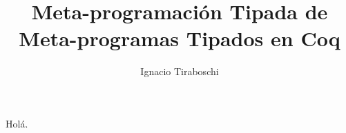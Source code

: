 \documentclass[11pt]{article}
\author{Ignacio Tiraboschi}
\title{Meta-programación Tipada de Meta-programas Tipados en Coq}
\begin{document}
\maketitle

Holá.
% 


% 
\end{document}
